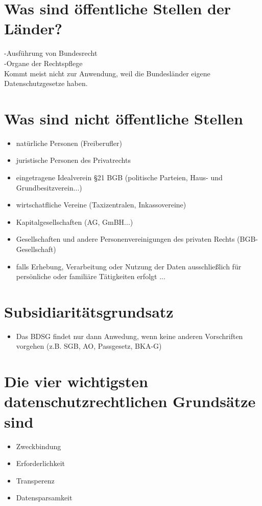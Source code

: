 \documentclass[a4paper,10pt]{scrartcl}
\begin{document}
 \section{Was sind öffentliche Stellen der Länder?}
 -Ausführung von Bundesrecht\\
 -Organe der Rechtspflege\\
 
 Kommt meist nicht zur Anwendung, weil die Bundesländer 
 eigene Datenschutzgesetze haben.
 
 \section{Was sind nicht öffentliche Stellen}
 \begin{itemize}
  \item natürliche Personen (Freiberufler)
  \item juristische Personen des Privatrechts
  \item eingetragene Idealverein §21 BGB (politische Parteien,
  Haus- und Grundbesitzverein...)
  \item wirtschatfliche Vereine (Taxizentralen, Inkassovereine)
  \item Kapitalgesellschaften (AG, GmBH...)
  \item Gesellschaften und andere Personenvereinigungen des privaten Rechts 
  (BGB-Gesellschaft)
  \item falls Erhebung, Verarbeitung oder Nutzung der Daten ausschließlich für
  persönliche oder familiäre Tätigkeiten erfolgt ... 
 \end{itemize}

 \section{Subsidiaritätsgrundsatz}
 \begin{itemize}
  \item Das BDSG findet nur dann Anwedung, wenn keine anderen Vorschriften vorgehen
  (z.B. SGB, AO, Passgesetz, BKA-G)
 \end{itemize}

 
  \section{Die vier wichtigsten datenschutzrechtlichen Grundsätze sind}
 
 \begin{itemize}
 \item Zweckbindung
 \item Erforderlichkeit
 \item Transperenz
 \item Datensparsamkeit
\end{itemize}
\end{document}
